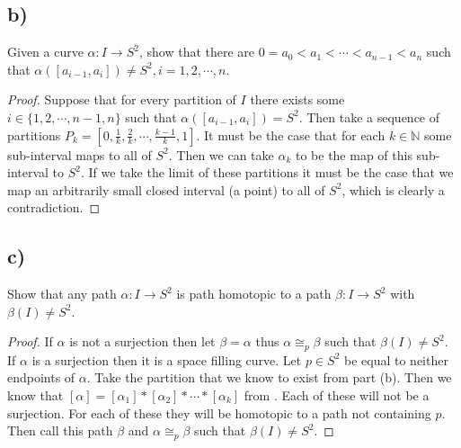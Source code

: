 \documentclass{article}
\theoremstyle{definition}
\begin{document}
\subsection*{b)}
\begin{mdframed}
    Given a curve $\alpha : I \rightarrow S^2$, show that there are $0 = a_0 < a_1 < \cdots < a_{n-1} < a_n$
    such that $\alpha([a_{i-1},a_i]) \neq S^2, i = 1,2, \cdots, n$.
\end{mdframed}
\begin{proof}
    Suppose that for every partition of $I$ there exists some $i \in \{1,2,\cdots,n-1,n\}$ such that $\alpha([a_{i-1},a_i]) = S^2$.
    Then take a sequence of partitions $P_k = [0,\frac{1}{k},\frac{2}{k},\cdots , \frac{k-1}{k}, 1]$. It must be the case 
    that for each $k \in \mathbb{N}$ some sub-interval maps to all of $S^2$. Then we can take $\alpha_k$ to be the map of this sub-interval to $S^2$.
    If we take the limit of these partitions it must be the case that we map an arbitrarily small closed interval (a point) to all of $S^2$, which 
    is clearly a contradiction.
\end{proof}
\subsection*{c)}
\begin{mdframed}
    Show that any path $\alpha : I \rightarrow S^2$ is path homotopic to a path $\beta : I \rightarrow S^2$ with $\beta(I) \neq S^2$.
\end{mdframed}
\begin{proof}
    If $\alpha$ is not a surjection then let $\beta = \alpha$ thus $\alpha \cong_p \beta$ such that $\beta(I) \neq S^2$.
    If $\alpha$ is a surjection then it is a space filling curve.
    Let $p \in S^2$ be equal to neither endpoints of $\alpha$.
    Take the partition that we know to exist from part (b). Then we know that $[\alpha] = [\alpha_1] * [\alpha_2] * \cdots * [\alpha_k]$ from .
    Each of these will not be a surjection. For each of these they will be homotopic to a path not containing $p$.
    Then call this path $\beta$ and $\alpha \cong_p \beta$ such that $\beta(I) \neq S^2$.
\end{proof}
\end{document}

